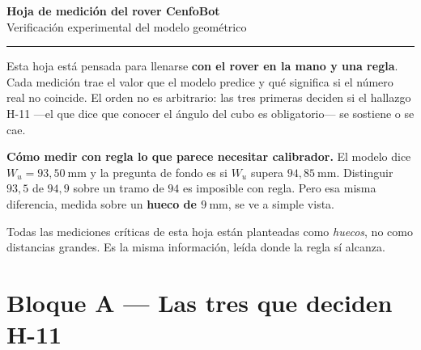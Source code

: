 \documentclass[11pt,a4paper]{article}
\theoremstyle{definition}
\begin{document}
\begin{center}
{\Large\bfseries Hoja de medición del rover CenfoBot}\\[0.25cm]
{\large Verificación experimental del modelo geométrico}\\[0.5cm]
\rule{\linewidth}{1pt}
\end{center}

\vspace{0.2cm}

\noindent
Esta hoja está pensada para llenarse \textbf{con el rover en la mano y una regla}.
Cada medición trae el valor que el modelo predice y qué significa si el número real
no coincide. El orden no es arbitrario: las tres primeras deciden si el hallazgo H-11
---el que dice que conocer el ángulo del cubo es obligatorio--- se sostiene o se cae.

\begin{tcolorbox}[colback=black!5,colframe=black!65,boxrule=0.7pt,arc=1pt]
\textbf{Cómo medir con regla lo que parece necesitar calibrador.} El modelo dice
$W_u = 93{,}50\ \mathrm{mm}$ y la pregunta de fondo es si $W_u$ supera
$94{,}85\ \mathrm{mm}$. Distinguir $93{,}5$ de $94{,}9$ sobre un tramo de $94$ es
imposible con regla. Pero esa misma diferencia, medida sobre un \textbf{hueco de
$9\ \mathrm{mm}$}, se ve a simple vista.

\smallskip
Todas las mediciones críticas de esta hoja están planteadas como \emph{huecos}, no como
distancias grandes. Es la misma información, leída donde la regla sí alcanza.
\end{tcolorbox}

\section*{Bloque A --- Las tres que deciden H-11}
\end{document}
